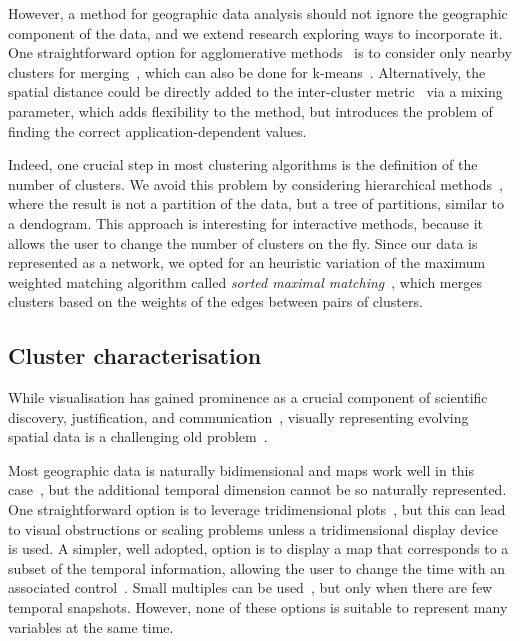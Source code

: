 However, a method for geographic data analysis should not ignore the geographic
component of the data, and we extend research exploring ways to incorporate it.
One straightforward option for agglomerative methods~\citep{han2001spatial} is
to consider only nearby clusters for merging~\citep{Chavent2017}, which can also
be done for k-means~\citep{soor2018extending}. Alternatively, the spatial
distance could be directly added to the inter-cluster metric~\citep{Chavent2017}
via a mixing parameter, which adds flexibility to the method, but introduces the
problem of finding the correct application-dependent values.

Indeed, one crucial step in most clustering algorithms is the definition of the
number of clusters. We avoid this problem by considering hierarchical
methods~\citep{soille2012morphological}, where the result is not a partition of
the data, but a tree of partitions, similar to a dendogram. This approach is
interesting for interactive methods, because it allows the user to change the
number of clusters on the fly. Since our data is represented as a network, we
opted for an heuristic variation of the maximum weighted matching algorithm
called \emph{sorted maximal matching}~\citep{markus2017}, which merges clusters
based on the weights of the edges between pairs of clusters. 



\subsection{Cluster characterisation}
While visualisation has gained prominence as a crucial component of scientific
discovery, justification, and communication~\cite{tufte1998visual}, visually
representing evolving spatial data is a challenging old
problem~\citep{monmonier1990strategies,andrienko2003exploratory,ferreira2015visual,Zheng2016}.

Most geographic data is naturally bidimensional and maps work well in this
case~\citep{Zheng2016,ward2015interactive}, but the additional temporal
dimension cannot be so naturally represented. One straightforward option is to
leverage tridimensional plots~\citep{andrienko2014visualization,Tominski2012a},
but this can lead to visual obstructions or scaling problems unless a
tridimensional display device is used. A simpler, well adopted,
option is to display a map that corresponds to a subset of the temporal
information, allowing the user to change the time with an associated
control~\citep{Chen2017,Valdivia2015,Alce2018,Doraiswamy2014}. Small multiples
can be used~\citep{VonLandesberger2016}, but only when there are few temporal
snapshots. However, none of these options is suitable to represent many
variables at the same time.


